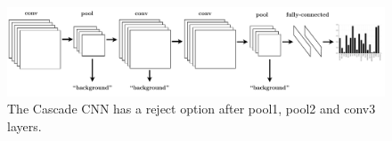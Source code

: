 \begin{figure}[h!]
\begin{center}
\includegraphics[width=0.98\columnwidth]{../ccnn/figures/ccnn.pdf}
\caption{
The Cascade CNN has a reject option after pool1, pool2 and conv3 layers.
}\label{fig:ccnn}
\end{center}
\end{figure}

